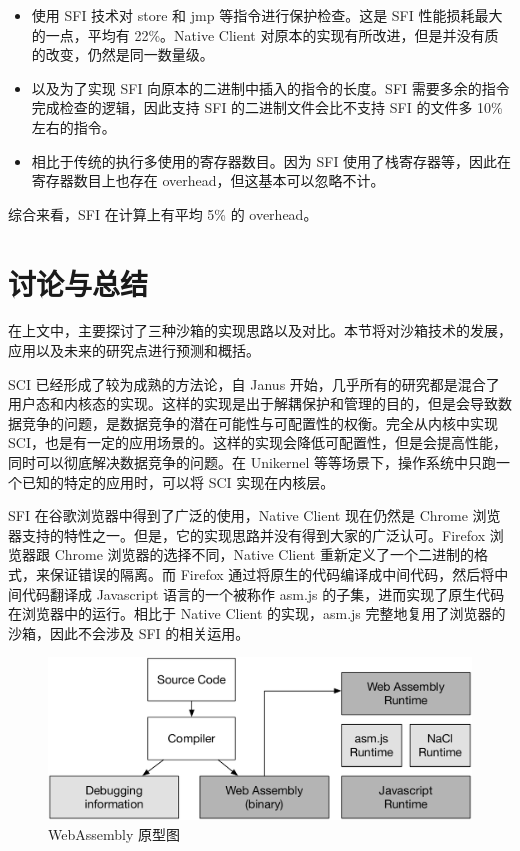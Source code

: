 \documentclass[final,12pt]{elsarticle}
\begin{document}
\begin{itemize}
\item
使用 SFI 技术对 store 和 jmp 等指令进行保护检查。这是 SFI 性能损耗最大的一点，平均有 22\%。Native Client 对原本的实现有所改进，但是并没有质的改变，仍然是同一数量级。
\item
以及为了实现 SFI 向原本的二进制中插入的指令的长度。SFI 需要多余的指令完成检查的逻辑，因此支持 SFI 的二进制文件会比不支持 SFI 的文件多 10\% 左右的指令。
\item
相比于传统的执行多使用的寄存器数目。因为 SFI 使用了栈寄存器等，因此在寄存器数目上也存在 overhead，但这基本可以忽略不计。
\end{itemize}

综合来看，SFI 在计算上有平均 5\% 的 overhead。


\section{讨论与总结}
\label{s:tucao}

在上文中，主要探讨了三种沙箱的实现思路以及对比。本节将对沙箱技术的发展，应用以及未来的研究点进行预测和概括。

SCI 已经形成了较为成熟的方法论，自 Janus 开始，几乎所有的研究都是混合了用户态和内核态的实现。这样的实现是出于解耦保护和管理的目的，但是会导致数据竞争的问题，是数据竞争的潜在可能性与可配置性的权衡。完全从内核中实现 SCI，也是有一定的应用场景的。这样的实现会降低可配置性，但是会提高性能，同时可以彻底解决数据竞争的问题。在 Unikernel 等等场景下，操作系统中只跑一个已知的特定的应用时，可以将 SCI 实现在内核层。

SFI 在谷歌浏览器中得到了广泛的使用，Native Client 现在仍然是 Chrome 浏览器支持的特性之一。但是，它的实现思路并没有得到大家的广泛认可。Firefox 浏览器跟 Chrome 浏览器的选择不同，Native Client 重新定义了一个二进制的格式，来保证错误的隔离。而 Firefox 通过将原生的代码编译成中间代码，然后将中间代码翻译成 Javascript 语言的一个被称作 asm.js 的子集，进而实现了原生代码在浏览器中的运行。相比于 Native Client 的实现，asm.js 完整地复用了浏览器的沙箱，因此不会涉及 SFI 的相关运用。

\begin{figure}
\centering
\includegraphics[width=0.7\linewidth]{imgs/wasm}
\caption{WebAssembly 原型图}
\label{fig:wasm}
\end{figure}
\end{document}
